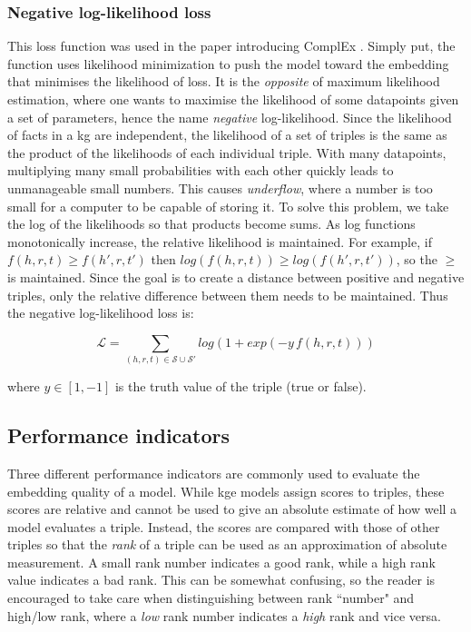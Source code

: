 \subsubsection{Negative log-likelihood loss}
This loss function was used in the paper introducing ComplEx \cite{complEx}. Simply put, the function uses likelihood minimization to push the model toward the embedding that minimises the likelihood of loss. It is the \textit{opposite} of maximum likelihood estimation, where one wants to maximise the likelihood of some datapoints given a set of parameters, hence the name \textit{negative} log-likelihood.
Since the likelihood of facts in a \gls{kg} are independent, the likelihood of a set of triples is the same as the product of the likelihoods of each individual triple. With many datapoints, multiplying many small probabilities with each other quickly leads to unmanageable small numbers. This causes \textit{underflow}, where a number is too small for a computer to be capable of storing it. To solve this problem, we take the log of the likelihoods so that products become sums. As log functions monotonically increase, the relative likelihood is maintained. For example, if $f(h,r,t) \geq f(h', r, t')$ then $log(f(h,r,t)) \geq log(f(h', r, t'))$, so the $\geq$ is maintained. Since the goal is to create a distance between positive and negative triples, only the relative difference between them needs to be maintained. Thus the negative log-likelihood loss is:

\[\mathcal{L}=\sum_{(h, r, t) \in \mathcal{S} \cup \mathcal{S'}}log(1+exp(-y \, f(h, r, t)))\]

where $y\in [1, -1]$ is the truth value of the triple (true or false).



    
\subsection{Performance indicators}
\label{Performance_indicators}
Three different performance indicators are commonly used to evaluate the embedding quality of a model. While \gls{kge} models assign scores to triples, these scores are relative and cannot be used to give an absolute estimate of how well a model evaluates a triple. Instead, the scores are compared with those of other triples so that the \textit{rank} of a triple can be used as an approximation of absolute measurement. A small rank number indicates a good rank, while a high rank value indicates a bad rank. This can be somewhat confusing, so the reader is encouraged to take care when distinguishing between rank ``number" and high/low rank, where a \textit{low} rank number indicates a \textit{high} rank and vice versa.

